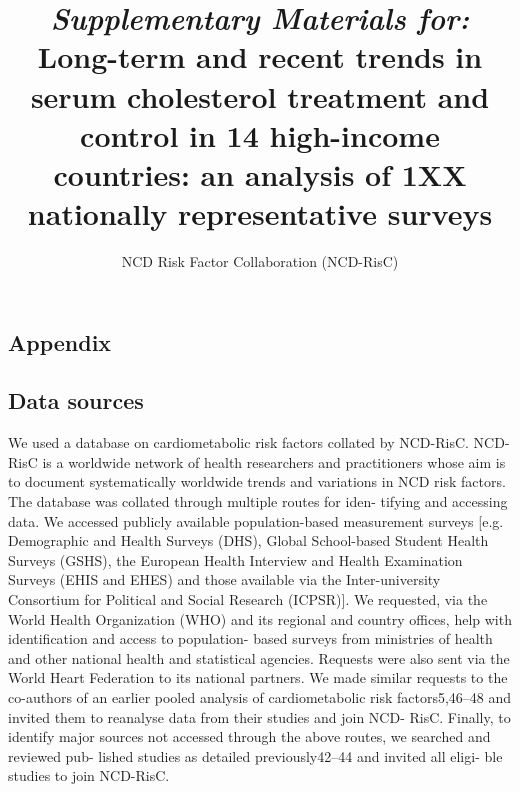 \documentclass[12pt]{article}
\begin{document}
\title{\textit{Supplementary Materials for:} Long-term and recent trends in serum cholesterol treatment and control in 14 high-income countries: an analysis of 1XX nationally representative surveys}
\author{NCD Risk Factor Collaboration (NCD-RisC)}
\maketitle
\clearpage
\begin{appendix}
\begin{refsection}
    \renewcommand{\thefigure}{A\arabic{figure}}
    \setcounter{figure}{0}
    
    \renewcommand{\thetable}{A\arabic{table}}
    \setcounter{table}{0}
    
    \newpage
    
    \section{Appendix} \label{sec:appendixa}
    \renewcommand{\thesection}{\Alph{section}}

    \subsection{Data sources}
    We used a database on cardiometabolic risk factors collated by NCD-RisC. NCD-RisC is a worldwide network of health researchers and practitioners whose aim is to document systematically worldwide trends and variations in NCD risk factors. The database was collated through multiple routes for iden- tifying and accessing data. We accessed publicly available population-based measurement surveys [e.g. Demographic and Health Surveys (DHS), Global School-based Student Health Surveys (GSHS), the European Health Interview and Health Examination Surveys (EHIS and EHES) and those available via the Inter-university Consortium for Political and Social Research (ICPSR)]. We requested, via the World Health Organization (WHO) and its regional and country offices, help with identification and access to population- based surveys from ministries of health and other national health and statistical agencies. Requests were also sent via the World Heart Federation to its national partners. We made similar requests to the co-authors of an earlier pooled analysis of cardiometabolic risk factors5,46–48 and invited them to reanalyse data from their studies and join NCD- RisC. Finally, to identify major sources not accessed through the above routes, we searched and reviewed pub- lished studies as detailed previously42–44 and invited all eligi- ble studies to join NCD-RisC.



\end{refsection}
\end{appendix}
\end{document}
